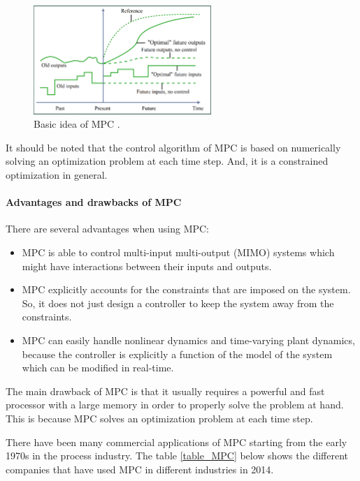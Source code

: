 \documentclass{thesisreport}
\begin{document}
 
 \begin{figure}[h]
 \centering
 \includegraphics[width=0.6\textwidth]{Images/Control/MPC_general_idea.png}
 \caption{Basic idea of MPC \cite{How2008}.}
 \label{MPC_basic_idea}
\end{figure}  
 
\noindent It should be noted that the control algorithm of MPC is based on numerically solving an optimization problem at each time step. And, it is a constrained optimization in general.
 
 \paragraph{Advantages and drawbacks of MPC} There are several advantages when using MPC: 
 
 \begin{itemize}
 	\item MPC is able to control multi-input multi-output (MIMO) systems which might have interactions between their inputs and outputs.
 	\item MPC explicitly accounts for the constraints that are imposed on the system. So, it does not just design a controller to keep the system away from the constraints.
 	\item MPC can easily handle nonlinear dynamics and time-varying plant dynamics, because the controller is explicitly a function of the model of the system which can be modified in real-time.
 \end{itemize}

\noindent The main drawback of MPC is that it usually requires a powerful and fast processor with a large memory in order to properly solve the problem at hand. This is because MPC solves an optimization problem at each time step.
 
\noindent There have been many commercial applications of MPC starting from the early 1970s in the process industry. The table \ref{table_MPC} below shows the different companies that have used MPC in different industries in 2014.
 
\end{document}
